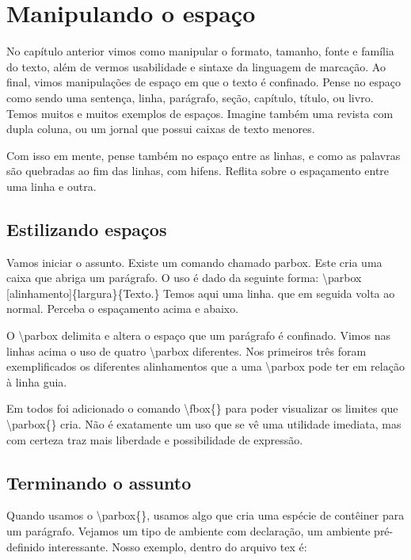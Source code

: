 \chapter{Manipulando o espaço}
No capítulo anterior vimos como manipular o formato, tamanho, fonte e família do texto,
além de vermos usabilidade e sintaxe da linguagem de marcação.
Ao final, vimos manipulações de espaço em que o texto é confinado.
Pense no espaço como sendo uma sentença, linha, parágrafo, seção,
capítulo, título, ou livro.
Temos muitos e muitos exemplos de espaços.
Imagine também uma revista com dupla coluna,
ou um jornal que possui caixas de texto menores.

Com isso em mente, pense também no espaço entre as linhas,
e como as palavras são quebradas ao fim das linhas, com hifens.
Reflita sobre o espaçamento entre uma linha e outra.

\section{Estilizando espaços}
Vamos iniciar o assunto. Existe um comando chamado parbox. Este cria uma caixa que abriga um parágrafo. O uso é dado da seguinte forma:
\newline
\noindent \textbackslash parbox [alinhamento]\{largura\}\{Texto.\}
\newline
Temos aqui uma linha.
que em seguida volta ao normal. Perceba o espaçamento acima e abaixo.

O \textbackslash parbox delimita e altera o espaço que um parágrafo é confinado.
Vimos nas linhas acima o uso de quatro \textbackslash parbox diferentes.
Nos primeiros três foram exemplificados os diferentes alinhamentos que a uma \textbackslash parbox pode ter em relação à linha guia.

Em todos foi adicionado o comando \textbackslash fbox\{\}
para poder visualizar os limites que \textbackslash parbox\{\} cria.
Não é exatamente um uso que se vê uma utilidade imediata,
mas com certeza traz mais liberdade e possibilidade de expressão.

\section{Terminando o assunto}
Quando usamos o \textbackslash parbox\{\}, usamos algo que cria uma espécie de contêiner para um parágrafo.
Vejamos um tipo de ambiente com declaração, um ambiente pré-definido interessante.
Nosso exemplo, dentro do arquivo tex é:

